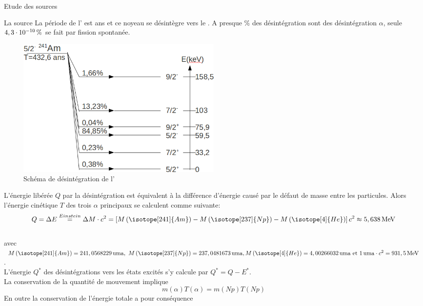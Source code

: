 \documentclass[a4paper,11pt,liststotocnumbered,bibtotocnumbered]{scrartcl}
\begin{document}
 \begin{section}{Etude des sources}
  \begin{subsection}{La source }
   La période de l' est \unit[432,6]{ans} et ce noyeau se désintègre vers le . A presque \unit[100]{\%} des désintégration sont des désintégration $\alpha$, seule $\unit[4,3\cdot10^{-10}]{\%}$ 
   se fait par fission spontanée.\\
   \begin{figure}[H]
    \begin{center}
     \includegraphics[width=0.5\textwidth]{Bilder/schemaAm1.png}
    \end{center}
    \caption{Schéma de désintégration de l'}
   \end{figure}
   L'énergie libérée $Q$ par la désintégration est équivalent à la différence d'énergie causé par le défaut de masse entre les particules. Alors l'énergie cinétique $T$ des trois $\alpha$ principaux se calculent comme suivante:
   \begin{equation*}
    Q=\Delta E\stackrel{Einstein}{=}\Delta M\cdot c^2=\left[M\left(\isotope[241]{Am}\right)-M\left(\isotope[237]{Np}\right)-M\left(\isotope[4]{He}\right)\right]c^2\approx\unit[5,638]{MeV}
   \end{equation*}\\
   avec $M\left(\isotope[241]{Am}\right)=\unit[241,0568229]{uma},\text{ }M\left(\isotope[237]{Np}\right)=\unit[237,0481673]{uma}, \\ M\left(\isotope[4]{He}\right)=\unit[4,00266032]{uma}\text{ et }\unit[1]{uma}\cdot c^2=\unit[931,5]{MeV}$.\\
   L'énergie $Q^{\ast}$ des désintégrations vers les états excités s'y calcule par $Q^{\ast}=Q-E^{\ast}$.\\
   La conservation de la quantité de mouvement implique
   \begin{equation*}
    m(\alpha)T(\alpha)=m(Np)T(Np)
   \end{equation*}
   En outre la conservation de l'énergie totale a pour conséquence

\end{subsection}
\end{section}
\end{document}
